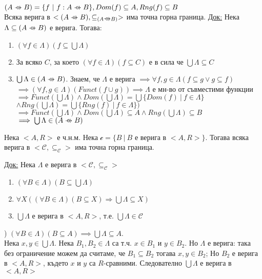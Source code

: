 \documentclass[fleqn, titlepage, 12pt]{report}
\newcommand*\rightcircarrow{\mathrel{\ooalign{$\rightarrow$\cr\hidewidth\hbox{$\circ\mkern 5mu$}\cr}}}
\begin{document}
$(A \rightcircarrow B) = \{f\ |\ f: A \rightcircarrow B\}, Dom(f) \subseteq A, Rng(f) \subseteq B$\\
Всяка верига в $<(A \rightcircarrow B), \subseteq_{(A \rightcircarrow B)}>$ има точна горна граница.
\bigbreak
\underline{Док:} Нека $\Lambda \subseteq (A \rightcircarrow B)$ е верига. Тогава:
\begin{enumerate}
  \item $(\forall{f \in \Lambda})(f \subseteq \bigcup \Lambda)$
  \item За всяко $C$, за което $(\forall{f \in \Lambda})(f \subseteq C)$ е в сила че $\bigcup \Lambda \subseteq C$
  \item $\bigcup \Lambda \in (A \rightcircarrow B)$. Знаем, че $\Lambda$ е верига
    $\implies \forall{f,g \in \Lambda}(f \subseteq g \lor g \subseteq f)$
    $\implies (\forall{f,g \in \Lambda})(Funct(f \cup g)) \implies \Lambda$ е мн-во от съвместими функции
    $\implies Funct(\bigcup \Lambda) \land Dom(\bigcup \Lambda) = \bigcup \{Dom(f)\ |\ f \in \Lambda\}$
    $\land Rng(\bigcup \Lambda) = \bigcup \{Rng(f)\ |\ f \in \Lambda\})$
    $\implies Funct(\bigcup \Lambda) \land Dom(\bigcup \Lambda) \subseteq A \land Rng(\bigcup \Lambda) \subseteq B$
    $\implies \bigcup \Lambda \in (A \rightcircarrow B)$
\end{enumerate}
\bigbreak

 Нека $<A,R>$ е ч.н.м. Нека $\mathcal{c} = \{B\ |\ B $ е верига в $ <A,R>\} $. Тогава всяка верига в
$<\mathcal{C}, \subseteq_{\mathcal{C}}>$ има точна горна граница.

\underline{Док:} Нека $\Lambda$ е верига в $<\mathcal{C}, \subseteq_{\mathcal{C}}>$

\begin{enumerate}
  \item $(\forall{B \in \Lambda})(B \subseteq \bigcup \Lambda)$
  \item $\forall{X}((\forall{B \in \Lambda})(B \subseteq X) \Rightarrow \bigcup \Lambda \subseteq X)$
  \item $\bigcup \Lambda$ е верига в $<A,R>$, т.е. $\bigcup \Lambda \in \mathcal{C}$
\end{enumerate}
) $(\forall{B \in \Lambda})(B \subseteq A) \implies \bigcup \Lambda \subseteq A$.\\
Нека $x,y \in \bigcup \Lambda$. Нека $B_1, B_2 \in \Lambda$ са т.ч. $x \in B_1$ и $y \in B_2$. Но $\Lambda$ е верига:
така без ограничение можем да считаме, че $B_1 \subseteq B_2$ тогава $x,y \in B_2$; Но $B_2$ е верига в $<A,R>$,
където $x$ и $y$ са $R$-сравними. Следователно $\bigcup \Lambda$ е верига в $<A,R>$
\bigbreak
\end{document}
